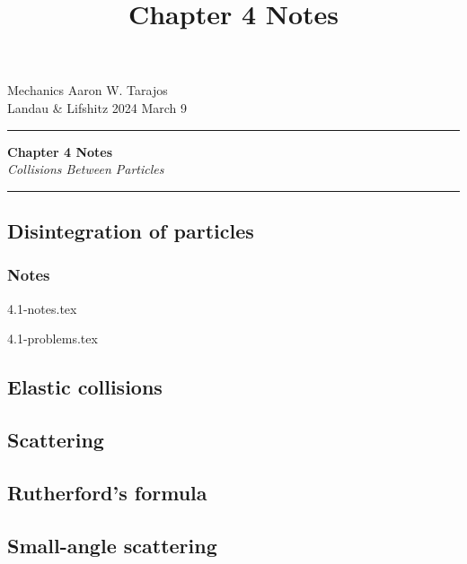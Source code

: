 \documentclass{article}
\title{Chapter 4 Notes}
\begin{document}
\flushleft
Mechanics \hfill Aaron W. Tarajos \\
Landau \& Lifshitz \hfill 2024 March 9 \\

\begin{center}
    \hrule
    \vspace{14pt}
    \textbf{\Large Chapter 4 Notes} \\
    \vspace{12pt}
    \textit{\large Collisions Between Particles}
    \vspace{14pt}
    \hrule
\end{center}

    \subsection{Disintegration of particles}
        \subsubsection*{Notes}
        {4.1-notes.tex}

        {4.1-problems.tex}

    \subsection{Elastic collisions}

    \subsection{Scattering}

    \subsection{Rutherford's formula}

    \subsection{Small-angle scattering}
\end{document}
